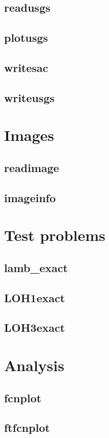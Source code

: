\documentclass[11pt]{report}
\begin{document}
\subsection{readusgs}
\subsection{plotusgs}
\subsection{writesac}
\subsection{writeusgs}

\section{Images}
\subsection{readimage}
\subsection{imageinfo}

\section{Test problems}
\subsection{lamb\_exact}
\subsection{LOH1exact}
\subsection{LOH3exact}

\section{Analysis}
\subsection{fcnplot}
\subsection{ftfcnplot}
\end{document}
